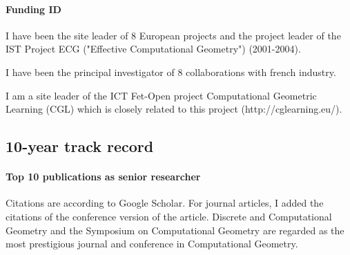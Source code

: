 



\paragraph{Funding ID} \mbox{}

 I have been the site leader of 8 European projects and the project leader of  the IST Project ECG ("Effective Computational Geometry") (2001-2004).

I have been the principal investigator of 8 collaborations with french industry.

I am a site leader of the ICT Fet-Open project Computational Geometric Learning (CGL) which is closely related to this project (http://cglearning.eu/). 

\newpage

\subsection{10-year track record}

\paragraph{Top 10 publications as senior researcher}  \mbox{} 

Citations are according to Google Scholar. For journal articles, I added the citations of the conference version of the article. Discrete and Computational Geometry and the Symposium on Computational Geometry are regarded as the most prestigious journal and conference in Computational Geometry.


